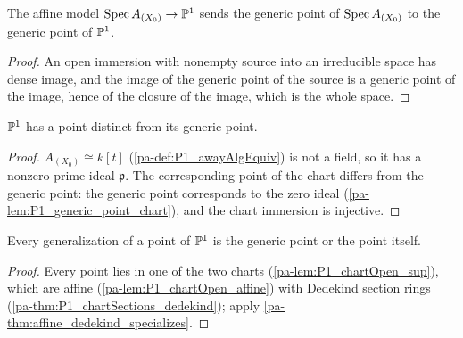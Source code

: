 \begin{lemma}
  \label{pa-lem:P1_generic_point_chart}
  \leanok

  The affine model \(\operatorname{Spec} A_{(X_0)} \to \mathbb{P}^1\) sends the generic point of
  \(\operatorname{Spec} A_{(X_0)}\) to the generic point of \(\mathbb{P}^1\).
\end{lemma}
\begin{proof}
  \leanok
  An open immersion with nonempty source into an irreducible space has dense image, and
  the image of the generic point of the source is a generic point of the image, hence of
  the closure of the image, which is the whole space.
\end{proof}

\begin{lemma}
  \label{pa-lem:P1_exists_ne_generic}
  \leanok

  \(\mathbb{P}^1\) has a point distinct from its generic point.
\end{lemma}
\begin{proof}
  \leanok
  \(A_{(X_0)} \cong k[t]\) (\ref{pa-def:P1_awayAlgEquiv}) is not a field, so it has a nonzero
  prime ideal \(\mathfrak p\). The corresponding point of the chart differs from the
  generic point: the generic point corresponds to the zero ideal
  (\ref{pa-lem:P1_generic_point_chart}), and the chart immersion is injective.
\end{proof}

\begin{theorem}
  \label{pa-thm:P1_specializes}
  \leanok

  Every generalization of a point of \(\mathbb{P}^1\) is the generic point or the point itself.
\end{theorem}
\begin{proof}
  \leanok
  Every point lies in one of the two charts (\ref{pa-lem:P1_chartOpen_sup}), which are affine
  (\ref{pa-lem:P1_chartOpen_affine}) with Dedekind section rings
  (\ref{pa-thm:P1_chartSections_dedekind}); apply \ref{pa-thm:affine_dedekind_specializes}.
\end{proof}

